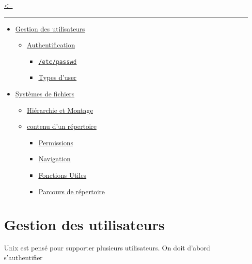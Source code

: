 \href{../README.md}{\textless--}

\begin{center}\rule{0.5\linewidth}{0.5pt}\end{center}

\begin{itemize}
\tightlist
\item
  \hyperref[gestion-des-utilisateurs]{Gestion des utilisateurs}

  \begin{itemize}
  \tightlist
  \item
    \hyperref[authentification]{Authentification}

    \begin{itemize}
    \tightlist
    \item
      \hyperref[etcpasswd]{\texttt{/etc/passwd}}
    \item
      \hyperref[types-duser]{Types d'user}
    \end{itemize}
  \end{itemize}
\item
  \hyperref[systuxe8mes-de-fichiers]{Systèmes de fichiers}

  \begin{itemize}
  \tightlist
  \item
    \hyperref[hiuxe9rarchie-et-montage]{Hiérarchie et Montage}
  \item
    \hyperref[contenu-dun-ruxe9pertoire]{contenu d'un répertoire}

    \begin{itemize}
    \tightlist
    \item
      \hyperref[permissions]{Permissions}
    \item
      \hyperref[navigation]{Navigation}
    \item
      \hyperref[fonctions-utiles]{Fonctions Utiles}
    \item
      \hyperref[parcours-de-ruxe9pertoire]{Parcours de répertoire}
    \end{itemize}
  \end{itemize}
\end{itemize}

\section{Gestion des utilisateurs}\label{gestion-des-utilisateurs}

Unix est pensé pour supporter plusieurs utilisateurs. On doit d'abord
s'authentifier

